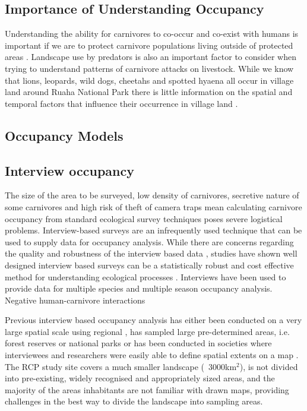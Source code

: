 \subsection{Importance of Understanding Occupancy}

Understanding the ability for carnivores to co-occur and co-exist with humans is important if we are to protect carnivore populations living outside of protected areas \citep{woodroffe2005,Dickman_2014,Ripple_2014}. Landscape use by predators is also an important factor to consider when trying to understand patterns of carnivore attacks on livestock. While we know that lions, leopards, wild dogs, cheetahs and spotted hyaena all occur in village land around Ruaha National Park \cite{Abade_2014,dickman2008} there is little information on the spatial and temporal factors that influence their occurrence in village land \cite{Abade2014a}.\\

\subsection{Occupancy Models}

\subsection{Interview occupancy}

The size of the area to be surveyed, low density of carnivores, secretive nature of some carnivores and high risk of theft of camera traps mean calculating carnivore occupancy from standard ecological survey techniques poses severe logistical problems. Interview-based surveys are an infrequently used technique that can be used to supply data for occupancy analysis. While there are concerns regarding the quality and robustness of the interview based data \cite{Sheil_2004}, studies have shown well designed interview based surveys can be a statistically robust and cost effective method for understanding ecological processes \cite{Meijaard_2011,Polfus_2013,Gros_1996}. Interviews have been used to provide data for multiple species \cite{Karanth_2009,Zeller_2011} and multiple season \cite{Pillay_2011} occupancy analysis.\\


Negative human-carnivore interactions 





Previous interview based occupancy analysis has either been conducted on a very large spatial scale using regional \cite{Karanth_2009}, has sampled large pre-determined areas, i.e. forest reserves or national parks \cite{Pillay_2011,Pillay_2013,brittain2013} or has been conducted in societies where interviewees and researchers were easily able to define spatial extents on a map \cite{Taubmann_2015,Zeller_2011,Petracca_2013}. The RCP study site covers a much smaller landscape (~3000km$^2$), is not divided into pre-existing, widely recognised and appropriately sized areas, and the majority of the areas inhabitants are not familiar with drawn maps, providing challenges in the best way to divide the landscape into sampling areas.\\

